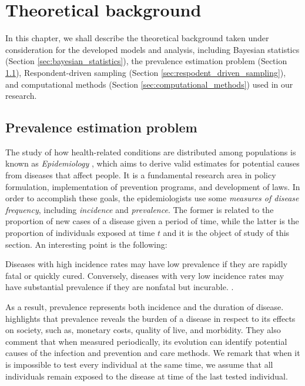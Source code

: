 \chapter{Theoretical background}
\label{ch:theoretical-background}

In this chapter, we shall describe the theoretical background
taken under consideration for the developed models and analysis, including
Bayesian statistics (Section \ref{sec:bayesian_statistics}), the prevalence 
estimation problem (Section \ref{sec:prevalence_estimation_problem}), 
Respondent-driven sampling (Section \ref{sec:respodent_driven_sampling}), 
and computational methods (Section
\ref{sec:computational_methods}) used in our research. 

\section{Prevalence estimation problem}
\label{sec:prevalence_estimation_problem}

The study of how health-related conditions are distributed among populations
is known as {\em Epidemiology} \cite[p. 32]{rothman2008modern}, which aims to derive valid estimates for
potential causes from diseases that affect people. It is a fundamental
research area in policy formulation, implementation of prevention programs,
and development of laws. In order to accomplish these goals, the
epidemiologists use some {\em measures of disease frequency}, including {\em
incidence} and {\em prevalence}. The former is related to the proportion of
new cases of a disease given a period of time, while the latter is the proportion
of individuals exposed at time $t$ and it is the object of
study of this section. An interesting point is the following:

\begin{citacao}
  Diseases with high incidence rates may have low prevalence if they are rapidly fatal or quickly cured. Conversely, diseases with very low incidence
  rates may have substantial prevalence if they are nonfatal but incurable.
  \cite[p. 46]{rothman2008modern}.
\end{citacao}

As a result, prevalence represents both incidence and the duration of disease. \textcite[p. c18]{noordzij2010measures} highlights that
prevalence reveals the burden of a disease in respect to its effects on
society, such as, monetary costs, quality of live, and morbidity. They also
comment that when measured periodically, its evolution can identify potential
causes of the infection and prevention and care methods.  We remark that when it is impossible to test every individual at the same
time, we assume that all individuals remain exposed to the disease at time of
the last tested individual.


